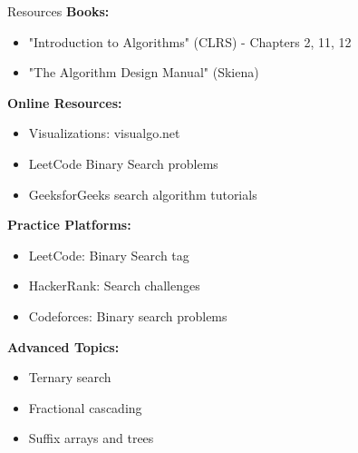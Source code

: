 \documentclass[aspectratio=169]{beamer}
\begin{document}
\begin{frame}{Resources}
  \textbf{Books:}
  \begin{itemize}
    \item "Introduction to Algorithms" (CLRS) - Chapters 2, 11, 12
    \item "The Algorithm Design Manual" (Skiena)
  \end{itemize}

  \vspace{0.3cm}
  \textbf{Online Resources:}
  \begin{itemize}
    \item Visualizations: visualgo.net
    \item LeetCode Binary Search problems
    \item GeeksforGeeks search algorithm tutorials
  \end{itemize}

  \vspace{0.3cm}
  \textbf{Practice Platforms:}
  \begin{itemize}
    \item LeetCode: Binary Search tag
    \item HackerRank: Search challenges
    \item Codeforces: Binary search problems
  \end{itemize}

  \vspace{0.3cm}
  \textbf{Advanced Topics:}
  \begin{itemize}
    \item Ternary search
    \item Fractional cascading
    \item Suffix arrays and trees
  \end{itemize}
\end{frame}
\end{document}
